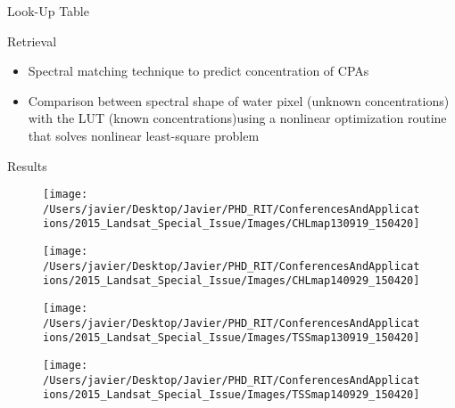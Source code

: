 \documentclass{beamer}
\begin{document}
\begin{frame}{}
\begin{columns}[t]
\begin{column}{.3\linewidth}
\begin{block}{Look-Up Table}
\end{block}
\begin{block}{Retrieval}
  \begin{itemize}
    \item Spectral matching technique to predict concentration of CPAs
    \vspace{0.5cm}
    \item Comparison between spectral shape of water pixel (unknown concentrations) with the LUT (known concentrations)using a nonlinear optimization routine that solves nonlinear least-square problem
  \end{itemize}
\end{block}

\begin{block}{Results}

\begin{figure}[htbp!]
  \begin{minipage}[c]{0.4\linewidth}
      \centering
      \texttt{[image: /Users/javier/Desktop/Javier/PHD\_RIT/ConferencesAndApplications/2015\_Landsat\_Special\_Issue/Images/CHLmap130919\_150420]}  
  \end{minipage}
  \hspace{1cm}
  \begin{minipage}[c]{0.4\linewidth}
      \centering
      \texttt{[image: /Users/javier/Desktop/Javier/PHD\_RIT/ConferencesAndApplications/2015\_Landsat\_Special\_Issue/Images/CHLmap140929\_150420]}  
  \end{minipage}
% 
  \begin{minipage}[c]{0.4\linewidth}
      \centering
      \texttt{[image: /Users/javier/Desktop/Javier/PHD\_RIT/ConferencesAndApplications/2015\_Landsat\_Special\_Issue/Images/TSSmap130919\_150420]}  
  \end{minipage}
  \hspace{1cm}
  \begin{minipage}[c]{0.4\linewidth}
      \centering
      \texttt{[image: /Users/javier/Desktop/Javier/PHD\_RIT/ConferencesAndApplications/2015\_Landsat\_Special\_Issue/Images/TSSmap140929\_150420]}  
  \end{minipage}


\end{figure}
\end{block}
\end{column}
\end{columns}
\end{frame}
\end{document}
